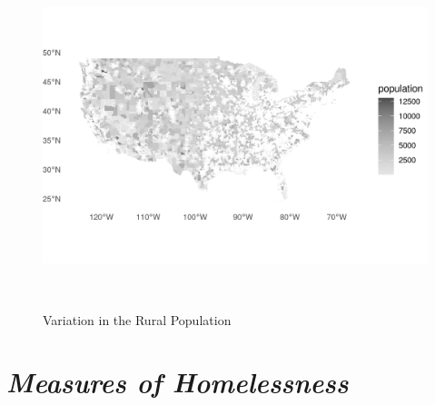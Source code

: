  

\begin{figure}[htbp] 

\centering 

\includegraphics[width=1\textwidth, height=10cm]{plots/pop_map.png} 

\caption{Variation in the Rural Population} 

\label{fig:pop_map} 

\end{figure} 

\section{\textit{Measures of Homelessness}} 

